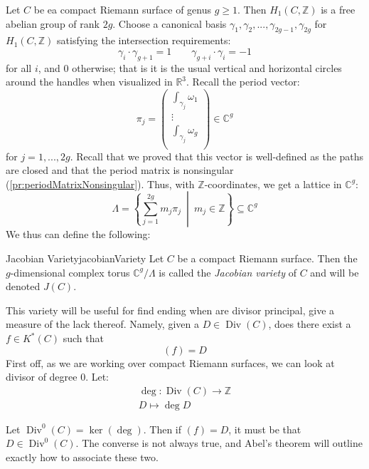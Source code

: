 \documentclass{book}
\newcommand{\C}{{\mathbb{C}}}
\newcommand{\R}{{\mathbb{R}}}
\newcommand{\Z}{{\mathbb{Z}}}
\newcommand{\Div}{{\operatorname{Div}}}
\newcommand{\sse}{\subseteq}
\newcommand{\set}[2]{\left\{#1 \ \middle|\ #2\right\}}
\begin{document}
Let $C$ be ea compact Riemann surface of genus $g\ge 1$. Then $H_1(C, \Z)$ is a free abelian group of rank
$2g$. Choose a canonical basis $\gamma_1, \gamma_2, ..., \gamma_{2g-1}, \gamma_{2g}$ for $H_1(C, \Z)$
satisfying the intersection requirements:
\[
  \gamma_i\cdot \gamma_{g+1} = 1 \qquad \gamma_{g+i}\cdot \gamma_i = -1
\]
for all $i$, and $0$ otherwise; that is it is the usual vertical and horizontal circles around the handles
when visualized in $\R^3$. Recall the period vector:
\[
  \pi_j = \begin{pmatrix}
    \int_{\gamma_j} \omega_1\\
  \vdots\\
  \int_{\gamma_j}\omega_g\\
  \end{pmatrix} \in \C^g
\]
 for $j = 1, ..., 2g$. Recall that we proved that this vector is well-defined as the paths are closed and that
 the period matrix is nonsingular (\cref{pr:periodMatrixNonsingular}). Thus, with $\Z$-coordinates, we get
 a lattice in $\C^g$:
 \[
   \Lambda = \set{\sum_{j=1}^{2g} m_j\pi_j}{m_j \in \Z} \sse \C^g
 \]
We thus can define the following:

\begin{defn}{Jacobian Variety}{jacobianVariety}
  Let $C$ be a compact Riemann surface. Then the $g$-dimensional complex torus $\C^g/\Lambda$ is called the
  \emph{Jacobian variety} of $C$ and will be denoted $J(C)$.
\end{defn}

This variety will be useful for find ending when are divisor principal, give a measure of the lack thereof.
Namely, given a $D \in \Div(C)$, does there exist a $f \in K^*(C)$ such that
\[
  (f) = D
\]
First off, as we are working over compact Riemann surfaces, we can look at divisor of degree $0$. Let:
\begin{gather*}
  \deg: \Div(C) \to \Z\\
  D \mapsto \deg D
\end{gather*}

Let $\Div^0(C) = \ker(\deg)$. Then if $(f) = D$, it must be that $D \in \Div^0(C)$. The converse is not always
true, and Abel's theorem will outline exactly how to associate these two.
\end{document}
